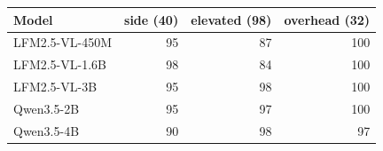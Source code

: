 \begin{tabular}{lrrr}
\toprule
Model & side (40) & elevated (98) & overhead (32) \\
\midrule
LFM2.5-VL-450M & 95 & 87 & 100 \\
LFM2.5-VL-1.6B & 98 & 84 & 100 \\
LFM2.5-VL-3B & 95 & 98 & 100 \\
Qwen3.5-2B & 95 & 97 & 100 \\
Qwen3.5-4B & 90 & 98 & 97 \\
\bottomrule
\end{tabular}
